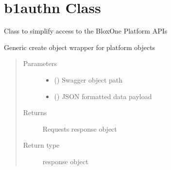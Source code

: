 \documentclass[letterpaper,10pt,english]{sphinxmanual}
\begin{document}
\section{b1authn Class}
\label{\detokenize{b1authn-class:b1authn-class}}\label{\detokenize{b1authn-class::doc}}

\begin{fulllineitems}
\label{\detokenize{b1authn-class:bloxone.b1authn}}
\sphinxAtStartPar
Class to simplify access to the BloxOne Platform APIs

\begin{fulllineitems}
\label{\detokenize{b1authn-class:bloxone.b1authn.create}}
\sphinxAtStartPar
Generic create object wrapper for platform objects
\begin{quote}\begin{description}
\item[{Parameters}] \leavevmode\begin{itemize}
\item {} 
\sphinxAtStartPar
{} () \textendash{} Swagger object path

\item {} 
\sphinxAtStartPar
{} () \textendash{} JSON formatted data payload

\end{itemize}

\item[{Returns}] \leavevmode
\sphinxAtStartPar
Requests response object

\item[{Return type}] \leavevmode
\sphinxAtStartPar
response object

\end{description}\end{quote}


\end{fulllineitems}
\end{fulllineitems}
\end{document}
